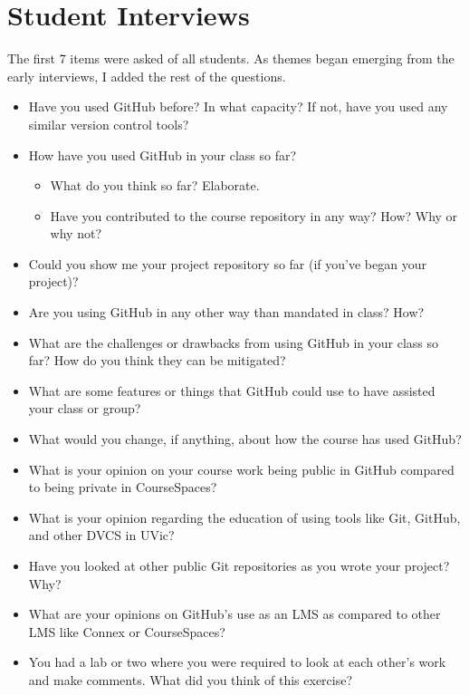 \section{Student Interviews}
The first 7 items were asked of all students. As themes began emerging from the early interviews, I added the rest of the questions.
\begin{itemize}
    \item Have you used GitHub before? In what capacity? If not, have you used any similar version control tools?
    \item How have you used GitHub in your class so far?
    \begin{itemize}
        \item What do you think so far? Elaborate.
        \item Have you contributed to the course repository in any way? How? Why or why not?
    \end{itemize}
    \item Could you show me your project repository so far (if you've began your project)?
    \item Are you using GitHub in any other way than mandated in class? How?
    \item What are the challenges or drawbacks from using GitHub in your class so far? How do you think they can be mitigated?
    \item What are some features or things that GitHub could use to have assisted your class or group?
    \item What would you change, if anything, about how the course has used GitHub?
    \item What is your opinion on your course work being public in GitHub compared to being private in CourseSpaces?
    \item What is your opinion regarding the education of using tools like Git, GitHub, and other DVCS in UVic?
    \item Have you looked at other public Git repositories as you wrote your project? Why?
    \item What are your opinions on GitHub's use as an LMS as compared to other LMS like Connex or CourseSpaces?
    \item You had a lab or two where you were required to look at each other's work and make comments. What did you think of this exercise?
\end{itemize}

